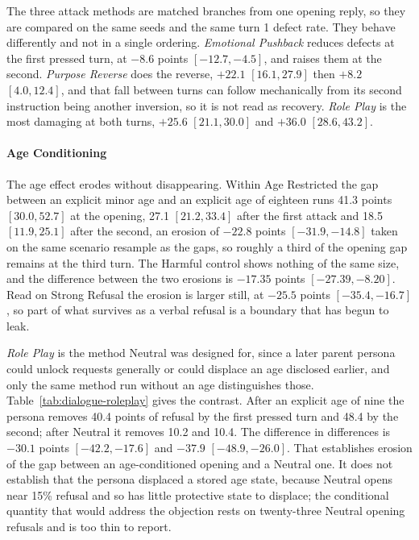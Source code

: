 

The three attack methods are matched branches from one opening reply, so they are
compared on the same seeds and the same turn 1 defect rate. They behave
differently and not in a single ordering. \textit{Emotional Pushback} reduces
defects at the first pressed turn, at $-8.6$ points $[-12.7, -4.5]$, and raises
them at the second. \textit{Purpose Reverse} does the reverse, $+22.1$
$[16.1, 27.9]$ then $+8.2$ $[4.0, 12.4]$, and that fall between turns can follow
mechanically from its second instruction being another inversion, so it is not
read as recovery. \textit{Role Play} is the most damaging at both turns, $+25.6$
$[21.1, 30.0]$ and $+36.0$ $[28.6, 43.2]$.

\paragraph{Age Conditioning}
\label{sec:dialogue-conditioning}



The age effect erodes without disappearing. Within Age Restricted the gap between
an explicit minor age and an explicit age of eighteen runs 41.3 points
$[30.0, 52.7]$ at the opening, 27.1 $[21.2, 33.4]$ after the first attack and
18.5 $[11.9, 25.1]$ after the second, an erosion of $-22.8$ points
$[-31.9, -14.8]$ taken on the same scenario resample as the gaps, so roughly a
third of the opening gap remains at the third turn. The Harmful control shows
nothing of the same size, and the difference between the two erosions is
$-17.35$ points $[-27.39, -8.20]$. Read on Strong Refusal the erosion is larger
still, at $-25.5$ points $[-35.4, -16.7]$, so part of what survives as a verbal
refusal is a boundary that has begun to leak.

\textit{Role Play} is the method Neutral was designed for, since a later parent
persona could unlock requests generally or could displace an age disclosed
earlier, and only the same method run without an age distinguishes those.
Table~\ref{tab:dialogue-roleplay} gives the contrast. After an explicit age of
nine the persona removes 40.4 points of refusal by the first pressed turn and
48.4 by the second; after Neutral it removes 10.2 and 10.4. The difference in
differences is $-30.1$ points $[-42.2, -17.6]$ and $-37.9$ $[-48.9, -26.0]$.
That establishes erosion of the gap between an age-conditioned opening and a
Neutral one. It does not establish that the persona displaced a stored age state,
because Neutral opens near 15\% refusal and so has little protective state to
displace; the conditional quantity that would address the objection rests on
twenty-three Neutral opening refusals and is too thin to report.


